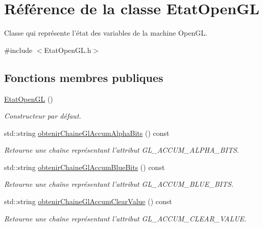 \hypertarget{class_etat_open_g_l}{\section{Référence de la classe Etat\-Open\-G\-L}
\label{class_etat_open_g_l}
}


Classe qui représente l'état des variables de la machine Open\-G\-L.  




{\ttfamily \#include $<$Etat\-Open\-G\-L.\-h$>$}

\subsection*{Fonctions membres publiques}
\begin{DoxyCompactItemize}
\item 
\hyperlink{group__utilitaire_gaf682f61929f2502b08b6b88de07349b6}{Etat\-Open\-G\-L} ()
\begin{DoxyCompactList}\small\item\em Constructeur par défaut. \end{DoxyCompactList}\item 
std\-::string \hyperlink{group__utilitaire_ga13c8aaca9f02431b47b83e36b18f8067}{obtenir\-Chaine\-Gl\-Accum\-Alpha\-Bits} () const 
\begin{DoxyCompactList}\small\item\em Retourne une chaîne représentant l'attribut G\-L\-\_\-\-A\-C\-C\-U\-M\-\_\-\-A\-L\-P\-H\-A\-\_\-\-B\-I\-T\-S. \end{DoxyCompactList}\item 
std\-::string \hyperlink{group__utilitaire_ga695387ee2d838c97214c70219d52da10}{obtenir\-Chaine\-Gl\-Accum\-Blue\-Bits} () const 
\begin{DoxyCompactList}\small\item\em Retourne une chaîne représentant l'attribut G\-L\-\_\-\-A\-C\-C\-U\-M\-\_\-\-B\-L\-U\-E\-\_\-\-B\-I\-T\-S. \end{DoxyCompactList}\item 
std\-::string \hyperlink{group__utilitaire_gaf3e85f5f434e93aa09376200f3c837ae}{obtenir\-Chaine\-Gl\-Accum\-Clear\-Value} () const 
\begin{DoxyCompactList}\small\item\em Retourne une chaîne représentant l'attribut G\-L\-\_\-\-A\-C\-C\-U\-M\-\_\-\-C\-L\-E\-A\-R\-\_\-\-V\-A\-L\-U\-E. \end{DoxyCompactList}\item 

\end{DoxyCompactItemize}
